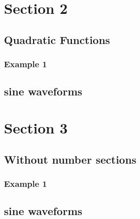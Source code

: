 \documentclass[14pt]{article}
\begin{document}
		
	\section{Section 2}
		\subsection{Quadratic Functions}
	\subsubsection{Example 1}
	\subsection{sine waveforms}
	
		\section*{Section 3}
	\subsection{Without number sections}
	\subsubsection{Example 1}
	\subsection{sine waveforms}
	
\end{document}
